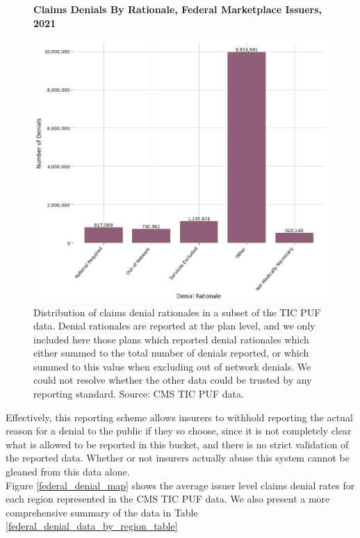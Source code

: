 \documentclass[psamsfonts]{amsart}
\theoremstyle{plain}
\theoremstyle{definition}
\theoremstyle{remark}
\begin{document}
\begin{figure}
	\centering
	\textbf{Claims Denials By Rationale, Federal Marketplace Issuers, 2021}\par\medskip
	\includegraphics[width=0.85\columnwidth]{images/cms_puf/denials_by_rationale.png}
	\caption{Distribution of claims denial rationales in a subset of the TIC PUF data. Denial rationales are reported at the plan level, and we only included here those plans which reported denial rationales which either summed to the total number of denials reported, or which summed to this value when excluding out of network denials. We could not resolve whether the other data could be trusted by any reporting standard. Source: CMS TIC PUF data.}
	\label{federal_denials_by_rationale}
\end{figure}

Effectively, this reporting scheme allows insurers to withhold reporting the actual reason for a denial to the public if they so choose, since it is not completely clear what is allowed to be reported in this bucket, and there is no strict validation of the reported data. Whether or not insurers actually abuse this system cannot be gleaned from this data alone.\\


Figure \ref{federal_denial_map} shows the average issuer level claims denial rates for each region represented in the CMS TIC PUF data. We also present a more comprehensive summary of the data in Table \ref{federal_denial_data_by_region_table}\\
\end{document}
